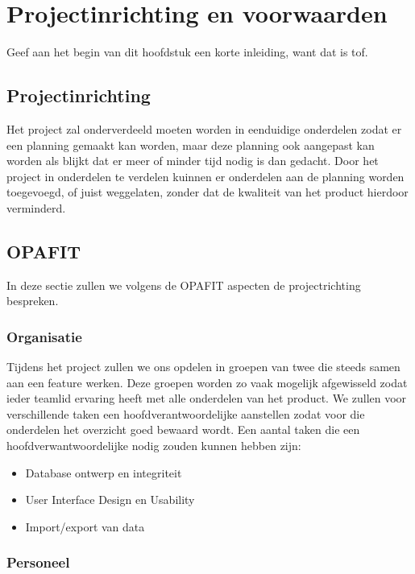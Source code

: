 \section{Projectinrichting en voorwaarden}
\label{projectinrichting}

Geef aan het begin van dit hoofdstuk een korte inleiding, want dat is tof. %

\subsection{Projectinrichting}

Het project zal onderverdeeld moeten worden in eenduidige onderdelen zodat er een planning gemaakt kan worden,
maar deze planning ook aangepast kan worden als blijkt dat er meer of minder tijd nodig is dan gedacht.
Door het project in onderdelen te verdelen kuinnen er onderdelen aan de planning worden toegevoegd,
of juist weggelaten, zonder dat de kwaliteit van het product hierdoor verminderd.

\subsection{OPAFIT}

In deze sectie zullen we volgens de OPAFIT aspecten de projectrichting bespreken.

\subsubsection{Organisatie}

Tijdens het project zullen we ons opdelen in groepen van twee die steeds samen aan een feature werken.
Deze groepen worden zo vaak mogelijk afgewisseld zodat ieder teamlid ervaring heeft met alle onderdelen van het product.
We zullen voor verschillende taken een hoofdverantwoordelijke aanstellen zodat voor die onderdelen het overzicht goed bewaard wordt.
Een aantal taken die een hoofdverwantwoordelijke nodig zouden kunnen hebben zijn:
\begin{itemize}
    \item Database ontwerp en integriteit
    \item User Interface Design en Usability
    \item Import/export van data
\end{itemize}

\subsubsection{Personeel}

